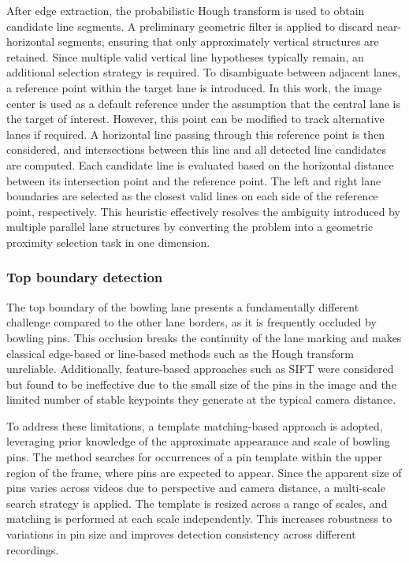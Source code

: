 After edge extraction, the probabilistic Hough transform is used to obtain candidate line segments. A preliminary geometric filter is applied to discard near-horizontal segments, ensuring that only approximately vertical structures are retained.
Since multiple valid vertical line hypotheses typically remain, an additional selection strategy is required. To disambiguate between adjacent lanes, a reference point within the target lane is introduced. In this work, the image center is used as a default reference under the assumption that the central lane is the target of interest. However, this point can be modified to track alternative lanes if required.
A horizontal line passing through this reference point is then considered, and intersections between this line and all detected line candidates are computed. Each candidate line is evaluated based on the horizontal distance between its intersection point and the reference point. The left and right lane boundaries are selected as the closest valid lines on each side of the reference point, respectively.
This heuristic effectively resolves the ambiguity introduced by multiple parallel lane structures by converting the problem into a geometric proximity selection task in one dimension. 


\subsubsection{Top boundary detection}
The top boundary of the bowling lane presents a fundamentally different challenge compared to the other lane borders, as it is frequently occluded by bowling pins. This occlusion breaks the continuity of the lane marking and makes classical edge-based or line-based methods such as the Hough transform unreliable. Additionally, feature-based approaches such as SIFT were considered but found to be ineffective due to the small size of the pins in the image and the limited number of stable keypoints they generate at the typical camera distance.

To address these limitations, a template matching-based approach is adopted, leveraging prior knowledge of the approximate appearance and scale of bowling pins. The method searches for occurrences of a pin template within the upper region of the frame, where pins are expected to appear.
Since the apparent size of pins varies across videos due to perspective and camera distance, a multi-scale search strategy is applied. The template is resized across a range of scales, and matching is performed at each scale independently. This increases robustness to variations in pin size and improves detection consistency across different recordings.

